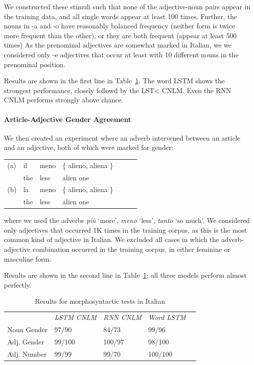 We constructed these stimuli such that none of the adjective-noun pairs appear in the training data, and all single words appear at least 100 times.
Further, the nouns in -a and  -o have reasonably balanced frequency (neither form is twice more frequent than the other), or they are both frequent (appear at least 500 times)
As the prenominal adjectives are somewhat marked in Italian, we  we considered only -e adjectives that occur at least with 10 different nouns in the prenominal position.

Results are shown in the first line in Table~\ref{tab:ital-agr-results}.
The word LSTM shows the strongest performance, closely followd by the LST< CNLM.
Even the RNN CNLM performs strongly above chance.

\paragraph{Article-Adjective Gender Agreement}
We then created an experiment where an adverb intervened between an article and an adjective, both of which were marked for gender:
\begin{tabular}{lllllll}
(a) & il & meno & \{ alieno, aliena \} \\
   &  the & less & alien one  \\
(b) & la & meno & \{ alieno, aliena \} \\
    &the & less & alien one \\
\end{tabular}
where we used the adverbs \emph{pi{\`u}} `more', \emph{meno} `less', \emph{tanto} `so much'.
We considered only adjectives that occurred 1K times in the training corpus, as this is the most common kind of adjective in Italian.
We excluded all cases in which the adverb-adjective combination occurred in the training corpus, in either feminine or masculine form.



Results are shown in the second line in Table~\ref{tab:ital-agr-results}; all three models perform almost perfectly.

\begin{table}[t]
  \begin{center}
    \begin{tabular}{l|l|l|l|l}
      \multicolumn{1}{c}{}&\emph{LSTM CNLM}&\emph{RNN CNLM}&\emph{Word LSTM}\\
	    Noun Gender & 97/90  & 84/73 & 99/96 \\
	    Adj. Gender & 99/100 & 100/97 & 98/100 \\
	    Adj. Number & 99/99 & 99/70 & 100/100 \\
    \end{tabular}
  \end{center}
  \caption{\label{tab:ital-agr-results} Results for morphosyntactic tests in Italian}
\end{table}


